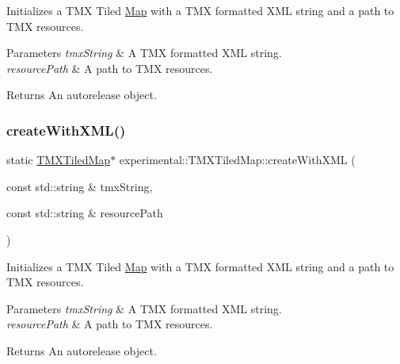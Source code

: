 Initializes a T\+MX Tiled \hyperlink{classMap}{Map} with a T\+MX formatted X\+ML string and a path to T\+MX resources.


\begin{DoxyParams}{Parameters}
{\em tmx\+String} & A T\+MX formatted X\+ML string. \\
\hline
{\em resource\+Path} & A path to T\+MX resources. \\
\hline
\end{DoxyParams}
\begin{DoxyReturn}{Returns}
An autorelease object. 
\end{DoxyReturn}
\mbox{\label{classexperimental_1_1TMXTiledMap_a482b4caac448d8300aef2df784cd31e7}} 
\subsubsection{\texorpdfstring{create\+With\+X\+M\+L()}{createWithXML()}\hspace{0.1cm}{\footnotesize\ttfamily [2/2]}}
{\footnotesize\ttfamily static \hyperlink{classexperimental_1_1TMXTiledMap}{T\+M\+X\+Tiled\+Map}$\ast$ experimental\+::\+T\+M\+X\+Tiled\+Map\+::create\+With\+X\+ML (\begin{DoxyParamCaption}\item[{const std\+::string \&}]{tmx\+String,  }\item[{const std\+::string \&}]{resource\+Path }\end{DoxyParamCaption})\hspace{0.3cm}{\ttfamily [static]}}

Initializes a T\+MX Tiled \hyperlink{classMap}{Map} with a T\+MX formatted X\+ML string and a path to T\+MX resources.


\begin{DoxyParams}{Parameters}
{\em tmx\+String} & A T\+MX formatted X\+ML string. \\
\hline
{\em resource\+Path} & A path to T\+MX resources. \\
\hline
\end{DoxyParams}
\begin{DoxyReturn}{Returns}
An autorelease object. 
\end{DoxyReturn}
\mbox{\label{classexperimental_1_1TMXTiledMap_adf91a0a108c7e78b84716cd926d96113}} 
